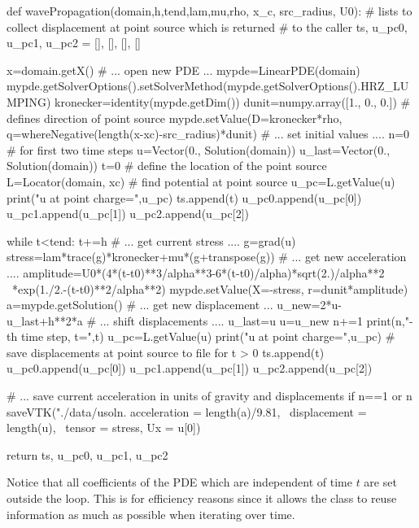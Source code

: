 \begin{python}
  def wavePropagation(domain,h,tend,lam,mu,rho, x_c, src_radius, U0):
     # lists to collect displacement at point source which is returned
     # to the caller
     ts, u_pc0, u_pc1, u_pc2 = [], [], [], []
    
     x=domain.getX()
     # ... open new PDE ...
     mypde=LinearPDE(domain)
     mypde.getSolverOptions().setSolverMethod(mypde.getSolverOptions().HRZ_LUMPING)
     kronecker=identity(mypde.getDim())
     dunit=numpy.array([1., 0., 0.]) # defines direction of point source
     mypde.setValue(D=kronecker*rho, q=whereNegative(length(x-xc)-src_radius)*dunit)
     # ... set initial values ....
     n=0
     # for first two time steps
     u=Vector(0., Solution(domain))
     u_last=Vector(0., Solution(domain))
     t=0
     # define the location of the point source 
     L=Locator(domain, xc)
     # find potential at point source
     u_pc=L.getValue(u)
     print("u at point charge=",u_pc)
     ts.append(t)
     u_pc0.append(u_pc[0])
     u_pc1.append(u_pc[1])
     u_pc2.append(u_pc[2])
  
     while t<tend:
       t+=h
       # ... get current stress ....
       g=grad(u)
       stress=lam*trace(g)*kronecker+mu*(g+transpose(g))
       # ... get new acceleration ....
       amplitude=U0*(4*(t-t0)**3/alpha**3-6*(t-t0)/alpha)*sqrt(2.)/alpha**2 \
                                               *exp(1./2.-(t-t0)**2/alpha**2)
       mypde.setValue(X=-stress, r=dunit*amplitude)
       a=mypde.getSolution()
       # ... get new displacement ...
       u_new=2*u-u_last+h**2*a
       # ... shift displacements ....
       u_last=u
       u=u_new
       n+=1
       print(n,"-th time step, t=",t)
       u_pc=L.getValue(u)
       print("u at point charge=",u_pc)
       # save displacements at point source to file for t > 0
       ts.append(t)
       u_pc0.append(u_pc[0])
       u_pc1.append(u_pc[1])
       u_pc2.append(u_pc[2])
  
       # ... save current acceleration in units of gravity and displacements 
       if n==1 or n%
         saveVTK("./data/usoln.%
                 acceleration = length(a)/9.81, \
                 displacement = length(u), \
  				 tensor = stress, Ux = u[0])
  
     return ts, u_pc0, u_pc1, u_pc2
\end{python}
Notice that all coefficients of the PDE which are independent of time $t$ are
set outside the \code{while} loop.
This is for efficiency reasons since it allows the \LinearPDE class to reuse
information as much as possible when iterating over time. 

